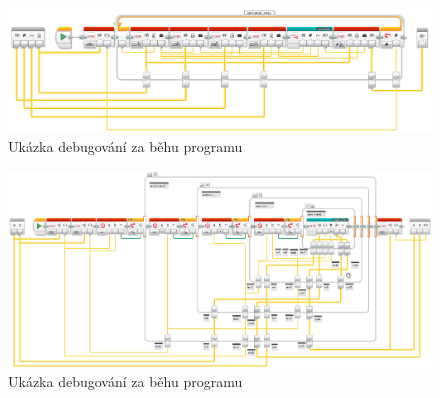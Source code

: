 \begin{figure}[h]
	\centering
	\includegraphics[width=\textwidth]{images/lego-soft/lego-soft_legolib_converge_array.png}
	\caption{Ukázka debugování za běhu programu}
	\label{fig:lego-soft_live-debuging_line-advance}
\end{figure}


\begin{figure}[h]
	\centering
	\includegraphics[width=\textwidth]{images/lego-soft/lego-soft_legolib_match_array_length.png}
	\caption{Ukázka debugování za běhu programu}
	\label{fig:lego-soft_live-debuging_line-advance}
\end{figure}



 